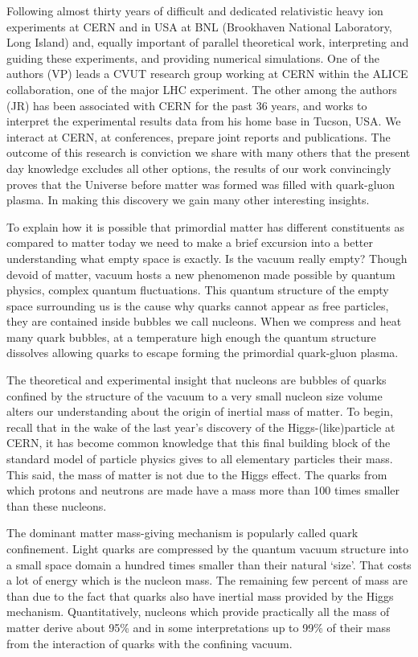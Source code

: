 \documentclass[twocolumn,showdate,prd,aps]{revtex4}
\begin{document}
Following almost thirty years of difficult and  dedicated relativistic heavy ion experiments at CERN and  in USA at BNL (Brookhaven National Laboratory, Long Island) and,  equally important of parallel theoretical work, interpreting  and guiding these experiments, and providing numerical simulations. One of the authors (VP) leads a CVUT research group working at CERN   within the ALICE collaboration, one of the major LHC experiment. The other among the authors (JR) has been associated with CERN for the past 36 years, and works to interpret the experimental results data from his home base in Tucson, USA.  We interact at CERN, at conferences, prepare joint reports and  publications. The outcome of this research is conviction we share with many others that  the present day knowledge excludes all other options, the results of our work convincingly proves that the Universe before matter was formed was filled with   quark-gluon plasma. In making this discovery we gain many other interesting insights. 

To explain how it is possible that primordial matter has different constituents as compared to matter today we need to make a brief excursion into a better understanding what empty space is exactly. Is the vacuum really empty?  Though devoid of matter, vacuum hosts a new phenomenon made possible by quantum physics, complex quantum fluctuations. This quantum structure of the empty space surrounding us is the cause why  quarks cannot appear as free particles, they are contained inside bubbles we call nucleons. When we compress and heat many quark bubbles, at a temperature high enough   the quantum structure   dissolves allowing quarks to escape  forming  the primordial quark-gluon plasma. 

The theoretical and experimental insight that nucleons are bubbles of quarks confined by the structure of the vacuum to a very small nucleon size volume alters our understanding about the origin of inertial mass of matter. To begin, recall that in the wake of the last year's discovery of the Higgs-(like)particle at CERN, it has become common knowledge that this final building block of   the standard model of particle physics gives to all elementary particles their mass. This said, the mass of matter is not due to the Higgs effect. The quarks from which protons and neutrons are made have a mass more than 100 times smaller than these nucleons. 

The dominant matter mass-giving mechanism  is  popularly called quark confinement. Light quarks are compressed by the quantum vacuum structure into a small space domain  a hundred times smaller than their natural `size'. That costs a lot of energy which is  the nucleon mass. The remaining few percent of mass are than due to the fact that quarks also have inertial mass provided by the Higgs mechanism. Quantitatively, nucleons which  provide practically all the mass of matter derive about 95\%  and in some interpretations up to 99\% of their mass from the interaction of quarks with the confining vacuum.
\end{document}
